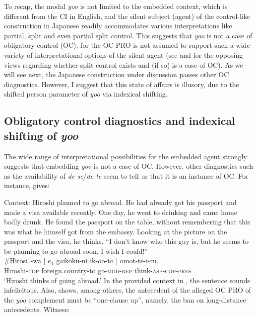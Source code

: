 \documentclass[output=paper]{langsci/langscibook}
\begin{document}
To recap, the modal \textit{yoo} is not limited to the embedded context, which is different from the CI in English, and the silent subject (agent) of the control-like construction in Japanese readily accommodates various interpretations like partial, split and even partial split control. This suggests that \textit{yoo} is not a case of obligatory control (OC), for the OC PRO is not assumed to support such a wide variety of interpretational options of the silent agent (see \citealt{landau2000} and \citet{hornstein1999,hornstein2003} for the opposing views regarding whether split control exists and (if so) is a case of OC). As we will see next, the Japanese construction under discussion passes other OC diagnostics. However, I suggest that this state of affairs is illusory, due to the shifted person parameter of \textit{yoo} via indexical shifting.

\subsection{Obligatory control diagnostics and indexical shifting of \textit{yoo}}
The wide range of interpretational possibilities for the embedded agent strongly suggests that embedding \textit{yoo} is not a case of OC. However, other diagnostics such as the availability of \textit{de se}/\textit{de te} seem to tell us that it is an instance of OC. For instance, \citet{fujii2006} gives:

\ea\label{shimamu12} Context: Hiroshi planned to go abroad. He had already got his passport and made a visa available recently. One day, he went to drinking and came home badly drunk. He found the passport on the table, without remembering that this was what he himself got from the embassy. Looking at the picture on the passport and the visa, he thinks, ``I don't know who this guy is, but he seems to be planning to go abroad soon. I wish I could!''\\
\hspace{-1.5mm}\#\gll Hirosi$_1$-wa [ $e_1$ gaikoku-ni ik-oo-to ] omot-te-i-ru.\\
Hiroshi-\textsc{top} {} {} foreign.country-to go-\textsc{mod-rep} {} think-\textsc{asp-cop-pres}\\
\glt `Hiroshi thinks of going abroad.' \citep[][106]{fujii2006}
\z
In the provided context in , the sentence sounds infelicitous. Also, \citet{fujii2006} shows, among others, the antecedent of the alleged OC PRO of the \textit{yoo} complement must be ``one-clause up'', namely, the ban on long-distance antecedents. Witness:
\end{document}
